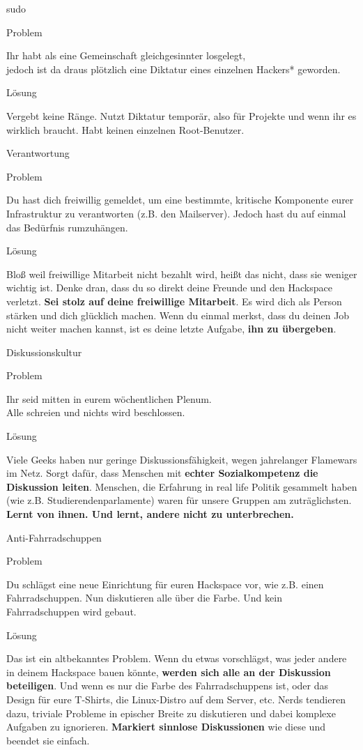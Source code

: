 \documentclass[aspectratio=43]{beamer}
\newcommand{\pattern}[2]{
  \begin{alertblock}{Problem}
    #1
  \end{alertblock}
  \pause
  \begin{exampleblock}{Lösung}
    #2
  \end{exampleblock}
}
\begin{document}
  \begin{frame}{sudo}
    \pattern{
      Ihr habt als eine Gemeinschaft gleichgesinnter losgelegt,\\
      jedoch ist da draus plötzlich eine Diktatur eines einzelnen Hackers* geworden.
    }{
      Vergebt keine Ränge. Nutzt Diktatur temporär, also für Projekte und wenn
      ihr es wirklich braucht. Habt keinen einzelnen Root-Benutzer.
    }
  \end{frame}

  \begin{frame}{Verantwortung}
    \pattern{
      Du hast dich freiwillig gemeldet, um eine bestimmte, kritische Komponente
      eurer Infrastruktur zu verantworten (z.B. den Mailserver). Jedoch hast du
      auf einmal das Bedürfnis rumzuhängen.
    }{
      Bloß weil freiwillige Mitarbeit nicht bezahlt wird, heißt das nicht, dass
      sie weniger wichtig ist. Denke dran, dass du so direkt deine Freunde und
      den Hackspace verletzt. \textbf{Sei stolz auf deine freiwillige
      Mitarbeit}. Es wird dich als Person stärken und dich glücklich machen.
      Wenn du einmal merkst, dass du deinen Job nicht weiter machen kannst, ist
      es deine letzte Aufgabe, \textbf{ihn zu übergeben}.
    }
  \end{frame}

  \begin{frame}{Diskussionskultur}
    \pattern{
      Ihr seid mitten in eurem wöchentlichen Plenum.\\
      Alle schreien und nichts wird beschlossen.
    }{
      Viele Geeks haben nur geringe Diskussionsfähigkeit, wegen jahrelanger Flamewars
      im Netz. Sorgt dafür, dass Menschen mit \textbf{echter Sozialkompetenz die
      Diskussion leiten}. Menschen, die Erfahrung in real life Politik gesammelt
      haben (wie z.B. Studierendenparlamente) waren für unsere Gruppen am
      zuträglichsten. \textbf{Lernt von ihnen. Und lernt, andere nicht zu
      unterbrechen.}
    }
  \end{frame}

  \begin{frame}{Anti-Fahrradschuppen}
    \pattern{
      Du schlägst eine neue Einrichtung für euren Hackspace vor, wie z.B.
      einen Fahrradschuppen. Nun diskutieren alle über die Farbe. Und kein
      Fahrradschuppen wird gebaut.
    }{
      Das ist ein altbekanntes Problem. Wenn du etwas vorschlägst, was jeder
      andere in deinem Hackspace bauen könnte, \textbf{werden sich alle an der
      Diskussion beteiligen}. Und wenn es nur die Farbe des Fahrradschuppens
      ist, oder das Design für eure T-Shirts, die Linux-Distro auf dem Server,
      etc. Nerds tendieren dazu, triviale Probleme in epischer Breite zu
      diskutieren und dabei komplexe Aufgaben zu ignorieren. \textbf{Markiert
      sinnlose Diskussionen} wie diese und beendet sie einfach.
    }
  \end{frame}
\end{document}
